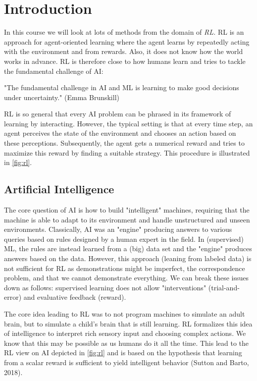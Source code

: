 \chapter{Introduction}
	In this course we will look at lots of methods from the domain of \emph{\ac{RL}.} \ac{RL} is an approach for agent-oriented learning where the agent learns by repeatedly acting with the environment and from rewards. Also, it does not know how the world works in advance. \ac{RL} is therefore close to how humans learn and tries to tackle the fundamental challenge of \ac{AI}:
	\begin{center}
		"The fundamental challenge in \acl{AI} and \acl{ML} is learning to make good decisions under uncertainty." (Emma Brunskill)
	\end{center}
	\ac{RL} is so general that every \ac{AI} problem can be phrased in its framework of learning by interacting. However, the typical setting is that at every time step, an agent perceives the state of the environment and chooses an action based on these perceptions. Subsequently, the agent gets a numerical reward and tries to maximize this reward by finding a suitable strategy. This procedure is illustrated in \autoref{fig:rl}.

	\section{Artificial Intelligence}
		The core question of \ac{AI} is how to build "intelligent" machines, requiring that the machine is able to adapt to its environment and handle unstructured and unseen environments. Classically, \ac{AI} was an "engine" producing answers to various queries based on rules designed by a human expert in the field. In (supervised) \ac{ML}, the rules are instead learned from a (big) data set and the "engine" produces answers based on the data. However, this approach (leaning from labeled data) is not sufficient for \ac{RL} as demonstrations might be imperfect, the correspondence problem, and that we cannot demonstrate everything. We can break these issues down as follows: supervised learning does not allow "interventions" (trial-and-error) and evaluative feedback (reward).

		The core idea leading to \ac{RL} was to not program machines to simulate an adult brain, but to simulate a child's brain that is still learning. \ac{RL} formalizes this idea of intelligence to interpret rich sensory input and choosing complex actions. We know that this may be possible as us humans do it all the time. This lead to the \ac{RL} view on \ac{AI} depicted in \autoref{fig:rl} and is based on the hypothesis that learning from a scalar reward is sufficient to yield intelligent behavior (Sutton and Barto, 2018).

